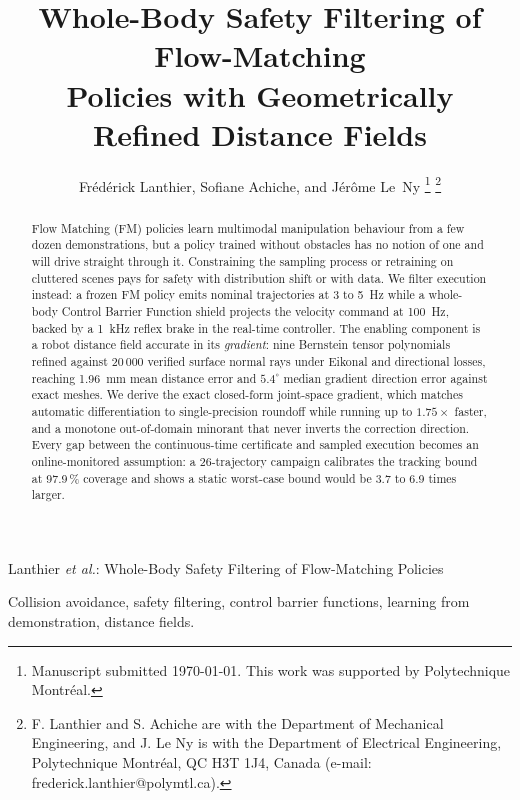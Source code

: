 \documentclass[journal]{IEEEtran}
\begin{document}
\title{Whole-Body Safety Filtering of Flow-Matching\\
Policies with Geometrically Refined Distance Fields}

\author{Fr\'ed\'erick Lanthier, Sofiane Achiche, and J\'er\^ome Le~Ny%
\thanks{Manuscript submitted \today. This work was supported by Polytechnique Montr\'eal.}%
\thanks{F. Lanthier and S. Achiche are with the Department of Mechanical Engineering, and J. Le Ny is with the Department of Electrical Engineering, Polytechnique Montr\'eal, QC H3T 1J4, Canada (e-mail: frederick.lanthier@polymtl.ca).}%
}

%
{Lanthier \MakeLowercase{\textit{et al.}}: Whole-Body Safety Filtering of Flow-Matching Policies}

\maketitle

\begin{abstract}
Flow Matching (FM) policies learn multimodal manipulation behaviour from a few dozen demonstrations, but a policy trained without obstacles has no notion of one and will drive straight through it. Constraining the sampling process or retraining on cluttered scenes pays for safety with distribution shift or with data. We filter execution instead: a frozen FM policy emits nominal trajectories at 3 to 5~Hz while a whole-body Control Barrier Function shield projects the velocity command at 100~Hz, backed by a 1~kHz reflex brake in the real-time controller. The enabling component is a robot distance field accurate in its \emph{gradient}: nine Bernstein tensor polynomials refined against 20\,000 verified surface normal rays under Eikonal and directional losses, reaching 1.96~mm mean distance error and $5.4^\circ$ median gradient direction error against exact meshes. We derive the exact closed-form joint-space gradient, which matches automatic differentiation to single-precision roundoff while running up to $1.75\times$ faster, and a monotone out-of-domain minorant that never inverts the correction direction. Every gap between the continuous-time certificate and sampled execution becomes an online-monitored assumption: a 26-trajectory campaign calibrates the tracking bound at 97.9\,\% coverage and shows a static worst-case bound would be 3.7 to 6.9 times larger.
\end{abstract}

\begin{IEEEkeywords}
Collision avoidance, safety filtering, control barrier functions, learning from demonstration, distance fields.
\end{IEEEkeywords}
\end{document}
